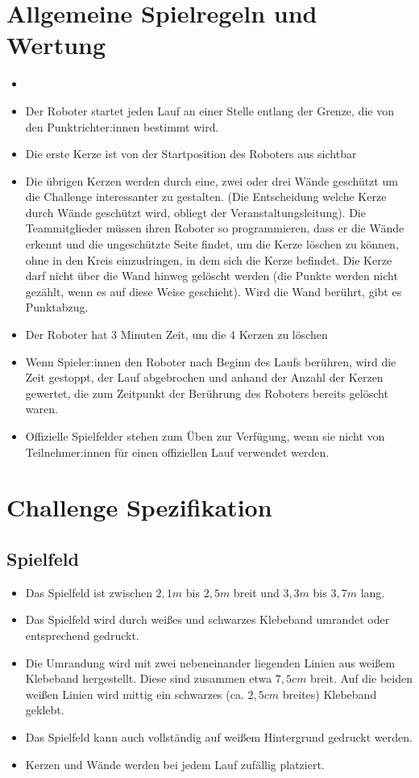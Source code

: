 \documentclass[a4paper,12pt]{article}
\begin{document}
\section{Allgemeine Spielregeln und Wertung}
\begin{itemize}
	\item \scoreRuns
	\item Der Roboter startet jeden Lauf an einer Stelle entlang der
		Grenze, die von den Punktrichter:innen bestimmt wird.
	\item Die erste Kerze ist von der Startposition des Roboters aus
		sichtbar
	\item Die übrigen Kerzen werden durch eine, zwei oder drei Wände
		geschützt um die Challenge interessanter zu gestalten. (Die
		Entscheidung welche Kerze durch Wände geschützt wird, obliegt
		der Veranstaltungsleitung). Die Teammitglieder müssen ihren
		Roboter so programmieren, dass er die Wände erkennt und die
		ungeschützte Seite findet, um die Kerze löschen zu können, ohne
		in den Kreis einzudringen, in dem sich die Kerze befindet.
		Die Kerze darf nicht über die Wand hinweg gelöscht werden (die
		Punkte werden nicht gezählt, wenn es auf diese Weise
		geschieht). Wird die Wand berührt, gibt es Punktabzug.
	\item Der Roboter hat 3 Minuten Zeit, um die 4 Kerzen zu löschen
	\item Wenn Spieler:innen den Roboter nach Beginn des Laufs berühren,
		wird die Zeit gestoppt, der Lauf abgebrochen und anhand der
		Anzahl der Kerzen gewertet, die zum Zeitpunkt der Berührung des
		Roboters bereits gelöscht waren.
	\item Offizielle Spielfelder stehen zum Üben zur Verfügung, wenn sie
		nicht von Teilnehmer:innen für einen offiziellen Lauf verwendet
		werden.
\end{itemize}

\section{Challenge Spezifikation}

\subsection{Spielfeld}
\begin{itemize}
	\item Das Spielfeld ist zwischen $2,1 m$ bis $2,5 m$ breit und $3,3 m$
		bis $3,7 m$ lang.
	\item Das Spielfeld wird durch weißes und schwarzes Klebeband
		umrandet oder entsprechend gedruckt.
	\item Die Umrandung wird mit zwei nebeneinander liegenden Linien aus
		weißem Klebeband hergestellt. Diese sind zusammen etwa $7,5 cm$
		breit. Auf die beiden weißen Linien wird mittig ein schwarzes
		(ca. $2,5 cm$ breites) Klebeband geklebt.
	\item Das Spielfeld kann auch vollständig auf weißem Hintergrund
		gedruckt werden.
	\item Kerzen und Wände werden bei jedem Lauf zufällig platziert.
\end{itemize}
\end{document}
